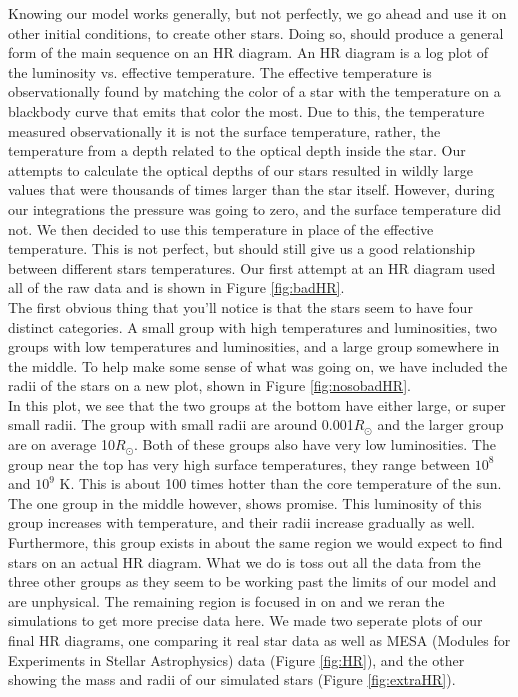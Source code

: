 \documentclass[10pt]{article}
\begin{document}
Knowing our model works generally, but not perfectly, we go ahead and use it on other initial conditions, to create other stars. Doing so, should produce a general form of the main sequence on an HR diagram. An HR diagram is a log plot of the luminosity vs. effective temperature. The effective temperature is observationally found by matching the color of a star with the temperature on a blackbody curve that emits that color the most. Due to this, the temperature measured observationally it is not the surface temperature, rather, the temperature from a depth related to the optical depth inside the star. Our attempts to calculate the optical depths of our stars resulted in wildly large values that were thousands of times larger than the star itself. However, during our integrations the pressure was going to zero, and the surface temperature did not. We then decided to use this temperature in place of the effective temperature. This is not perfect, but should still give us a good relationship between different stars temperatures. Our first attempt at an HR diagram used all of the raw data and is shown in Figure \ref{fig:badHR}. \\

The first obvious thing that you'll notice is that the stars seem to have four distinct categories. A small group with high temperatures and luminosities, two groups with low temperatures and luminosities, and a large group somewhere in the middle. To help make some sense of what was going on, we have included the radii of the stars on a new plot, shown in Figure \ref{fig:nosobadHR}. \\

In this plot, we see that the two groups at the bottom have either large, or super small  radii. The group with small radii are around 0.001$R_\odot$ and the larger group are on average 10$R_\odot$. Both of these groups also have very low luminosities. The group near the top has very high surface temperatures, they range between $10^8$ and $10^9$ K. This is about 100 times hotter than the core temperature of the sun. The one group in the middle however, shows promise. This luminosity of this group increases with temperature, and their radii increase gradually as well. Furthermore, this group exists in about the same region we would expect to find stars on an actual HR diagram. What we do is toss out all the data from the three other groups as they seem to be working past the limits of our model and are unphysical. The remaining region is focused in on and we reran the simulations to get more precise data here. We made two seperate plots of our final HR diagrams, one comparing it real star data as well as MESA (Modules for Experiments in Stellar Astrophysics) data (Figure \ref{fig:HR}), and the other showing the mass and radii of our simulated stars (Figure \ref{fig:extraHR}). \\
\end{document}
